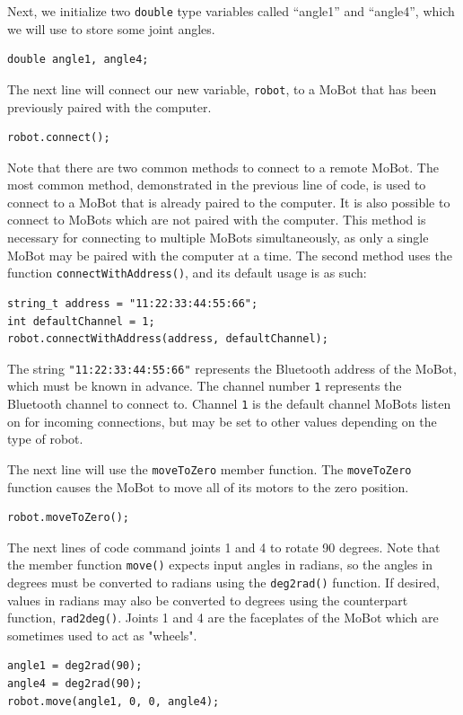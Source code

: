\documentclass{article}
\begin{document}
Next, we initialize two \texttt{double} type variables called 
``angle1'' and ``angle4'', which we will use to store some joint angles.
\begin{verbatim}
double angle1, angle4;
\end{verbatim}

The next line will connect our new variable, \texttt{robot}, to a
MoBot that has been previously paired with the computer.
\begin{verbatim}
robot.connect();
\end{verbatim}

Note that there are two common methods to connect to a remote MoBot. 
The most common method, demonstrated in the previous line of code, is
used to connect to a MoBot that is already paired to the computer. It
is also possible to connect to MoBots which are not paired with the 
computer. This method is necessary for connecting to multiple
MoBots simultaneously, as only a single MoBot may be paired with the
computer at a time. The second method uses the function
\texttt{connectWithAddress()}, and its default usage is as such:
\begin{verbatim}
string_t address = "11:22:33:44:55:66";
int defaultChannel = 1;
robot.connectWithAddress(address, defaultChannel);
\end{verbatim}
The string \texttt{"11:22:33:44:55:66"} represents the Bluetooth address
of the MoBot, which must be known in advance. The channel number \texttt{1} 
represents the Bluetooth channel to connect to. Channel \texttt{1}
is the default channel MoBots listen on for incoming connections, but
may be set to other values depending on the type of robot.

The next line will use the \texttt{moveToZero} member function. The
\texttt{moveToZero} function causes the MoBot to move all of its motors to the
zero position.
\begin{verbatim}
robot.moveToZero();
\end{verbatim}

The next lines of code command joints 1 and 4 to rotate 90 degrees.
Note that the member function \texttt{move()} expects input angles
in radians, so the angles in degrees must be converted to radians
using the \texttt{deg2rad()} function. If desired, values in radians
may also be converted to degrees using the counterpart function,
\texttt{rad2deg()}.
Joints 1 and 4 are the faceplates
of the MoBot which are sometimes used to act as "wheels".
\begin{verbatim}
angle1 = deg2rad(90);
angle4 = deg2rad(90);
robot.move(angle1, 0, 0, angle4);
\end{verbatim}
\end{document}
